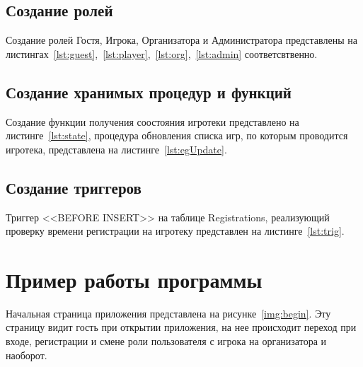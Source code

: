 \subsection{Создание ролей}

Создание ролей Гостя, Игрока, Организатора и Администратора представлены на
листингах~\ref{lst:guest},~\ref{lst:player},~\ref{lst:org},~\ref{lst:admin}
соответсвтвенно.

{
\captionsetup{format=hang,justification=raggedright,
              singlelinecheck=off,width=16cm}
}

\clearpage
\subsection{Создание хранимых процедур и функций}

Создание функции получения соостояния игротеки представлено на
листинге~\ref{lst:state}, процедура обновления списка игр, по которым проводится
игротека, представлена на листинге~\ref{lst:egUpdate}.

{
\captionsetup{format=hang,justification=raggedright,
              singlelinecheck=off,width=16cm}
}

\subsection{Создание триггеров}

Триггер <<BEFORE INSERT>> на таблице Registrations, реализующий проверку времени
регистрации на игротеку представлен на листинге~\ref{lst:trig}.

{
\captionsetup{format=hang,justification=raggedright,
              singlelinecheck=off,width=16cm}
}

\section{Пример работы программы}

Начальная страница приложения представлена на рисунке~\ref{img:begin}. Эту
страницу видит гость при открытии приложения, на нее происходит переход при
входе, регистрации и смене роли пользователя с игрока на организатора и
наоборот.

